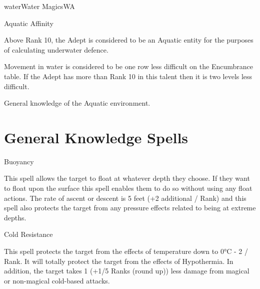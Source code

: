 \begin{College}[1.3]{water}{Water Magics}{WA}
\begin{talent}[T-3]{Aquatic Affinity}
\begin{effects}
\begin{Enumerate}
\item Above Rank 10, the Adept is considered to be an Aquatic entity
  for the purposes of calculating underwater defence.

\item Movement in water is considered to be one row less difficult on
  the Encumbrance table.  If the Adept has more than Rank 10 in this
  talent then it is two levels less difficult.

\item General knowledge of the Aquatic environment. 
\end{Enumerate}
\end{effects}
\end{talent}


\section{General Knowledge Spells}

\begin{spell}[G-1]{Buoyancy}

\begin{effects}
This spell allows the target to float at whatever depth they choose.
If they want to float upon the surface this spell enables them to do
so without using any float actions.  The rate of ascent or descent is
5 feet (+2 additional / Rank) and this spell also protects the target
from any pressure effects related to being at extreme depths.
\end{effects}
\end{spell}

\begin{spell}[G-2]{Cold Resistance}

\begin{effects}
This spell protects the target from the effects of temperature down to
0°C - 2 / Rank.  It will totally protect the target from the effects
of Hypothermia.  In addition, the target takes 1 (+1/5 Ranks (round
up)) less damage from magical or non-magical cold-based attacks.
\end{effects}
\end{spell}


\end{College}
